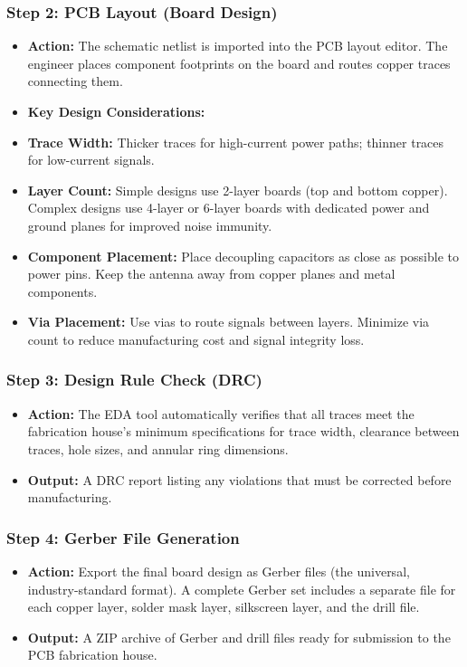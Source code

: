 \subsubsection{Step 2: PCB Layout (Board Design)}
\begin{itemize}
  \item   \textbf{Action:} The schematic netlist is imported into the PCB layout editor. The engineer places component footprints on the board and routes copper traces connecting them.
  \item   \textbf{Key Design Considerations:}
  \item   \textbf{Trace Width:} Thicker traces for high-current power paths; thinner traces for low-current signals.
  \item   \textbf{Layer Count:} Simple designs use 2-layer boards (top and bottom copper). Complex designs use 4-layer or 6-layer boards with dedicated power and ground planes for improved noise immunity.
  \item   \textbf{Component Placement:} Place decoupling capacitors as close as possible to power pins. Keep the antenna away from copper planes and metal components.
  \item   \textbf{Via Placement:} Use vias to route signals between layers. Minimize via count to reduce manufacturing cost and signal integrity loss.
\end{itemize}

\subsubsection{Step 3: Design Rule Check (DRC)}
\begin{itemize}
  \item   \textbf{Action:} The EDA tool automatically verifies that all traces meet the fabrication house's minimum specifications for trace width, clearance between traces, hole sizes, and annular ring dimensions.
  \item   \textbf{Output:} A DRC report listing any violations that must be corrected before manufacturing.
\end{itemize}

\subsubsection{Step 4: Gerber File Generation}
\begin{itemize}
  \item   \textbf{Action:} Export the final board design as Gerber files (the universal, industry-standard format). A complete Gerber set includes a separate file for each copper layer, solder mask layer, silkscreen layer, and the drill file.
  \item   \textbf{Output:} A ZIP archive of Gerber and drill files ready for submission to the PCB fabrication house.
\end{itemize}

